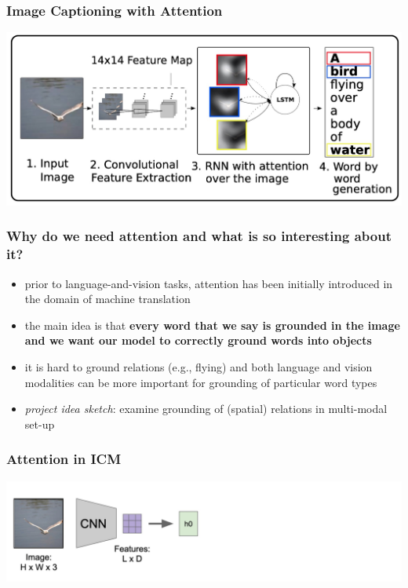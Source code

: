 \documentclass[aspectratio=1610]{beamer} %
\begin{document}
\begin{frame}
\frametitle{Image Captioning with Attention \citep{xu2016show}}
\begin{center}
\includegraphics[width=.9\textwidth]{pics/att1}
\end{center}
\end{frame}

\begin{frame}
\frametitle{Why do we need attention and what is so interesting about it?}

\begin{itemize}
	\item prior to language-and-vision tasks, attention has been initially introduced in the domain of machine translation \citep{bahdanau2016neural}
	\pause
	\item the main idea is that \textbf{every word that we say is grounded in the image and we want our model to correctly ground words into objects}
	\pause
	\item it is hard to ground relations (e.g., flying) and both language and vision modalities can be more important for grounding of particular word types \citep{lu2017,ghanimifard2019,ilinykh2021}
	\pause
	\item \textit{project idea sketch}: examine grounding of (spatial) relations in multi-modal set-up
\end{itemize}

\end{frame}


\begin{frame}
\frametitle{Attention in ICM}
\begin{center}
\includegraphics[width=1\textwidth]{pics/att2}
\end{center}
\end{frame}
\end{document}

